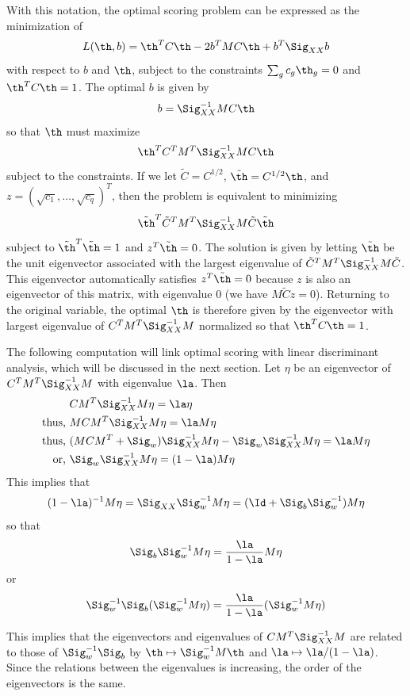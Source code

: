 With this notation, the optimal scoring problem can be expressed as the minimization of 
\[
L(\th, b) = \th^TC \th - 2 b^TMC \th + b^T\Sig_{XX} b
\]
with respect to $b$ and $\th$, subject to the constraints $\sum_g c_g \th_g = 0$ and $\th^TC\th = 1$. The optimal $b$ is given by
\[
b = \Sig_{XX}^{-1} MC\th
\]
so that $\th$ must maximize
\[
\th^T C^TM^T \Sig_{XX}^{-1} MC\th
\]
subject to the constraints. If we let $\tilde C = C^{1/2}$, $\tilde\th = C^{1/2} \th$, and $z = (\sqrt{c_1}, \ldots, \sqrt{c_q})^T$, then the problem is equivalent to minimizing
\[
\tilde \th^T \tilde C^TM^T \Sig_{XX}^{-1} M\tilde C \tilde \th
\]
subject to $\tilde\th^T\tilde \th = 1$ and $z^T\tilde\th = 0$. The solution is given by letting $\tilde \th$ be the unit eigenvector associated with the largest eigenvalue of $\tilde C^TM^T \Sig_{XX}^{-1} M\tilde C$. This eigenvector automatically satisfies $z^T\tilde\th = 0$ because $z$ is also an eigenvector of this matrix, with eigenvalue 0 (we have $M\tilde C z  = 0$). Returning to the original variable, the optimal $\th$ is therefore given by the eigenvector with largest eigenvalue of $C^TM^T \Sig_{XX}^{-1} M$ normalized so that $\th^TC\th = 1$.


The following computation will link optimal scoring with linear discriminant analysis, which will be discussed in the next section. 
 Let $\eta$ be an eigenvector of $C^TM^T \Sig_{XX}^{-1} M$ with eigenvalue $\la$. Then 
\begin{align*}
&CM^T\Sig_{XX}^{-1} M\eta  = \la\eta\\
\text{thus, }& MCM^T\Sig_{XX}^{-1} M\eta = \la M\eta\\
\text{thus, }& (MCM^T + \Sig_w)\Sig_{XX}^{-1} M\eta - \Sig_w \Sig_{XX}^{-1} M\eta = \la M\eta\\
\text{or, }&  \Sig_w \Sig_{XX}^{-1} M\eta = (1-\la) M\eta
\end{align*}
This implies that 
$$(1-\la)^{-1} M\eta = \Sig_{XX}\Sig_w^{-1} M\eta = (\Id +
\Sig_b\Sig_w^{-1})M\eta$$
so that
$$
\Sig_b\Sig_w^{-1}M\eta = \frac{\la}{1-\la} M\eta
$$
or
$$
\Sig_w^{-1}\Sig_b (\Sig_w^{-1}M\eta) = \frac{\la}{1-\la} (\Sig_w^{-1} M\eta)
$$

This implies that the eigenvectors and eigenvalues of
$CM^T\Sig_{XX}^{-1} M$ are related to those of $\Sig_w^{-1}\Sig_b$ by 
$\th \mapsto \Sig_w^{-1}M\th$ and $\la \mapsto \la/(1-\la)$. Since the
relations between the eigenvalues is increasing, the order of the
eigenvectors is the same.




